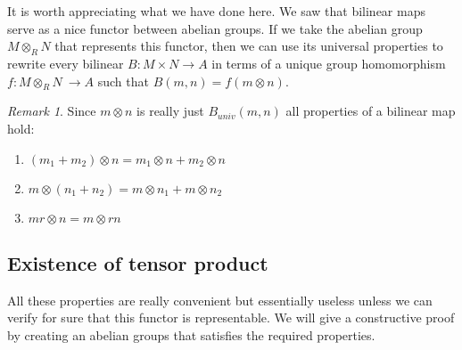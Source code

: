 \documentclass{article}
\newcommand{\tp}[2]{#1 \otimes_R #2}
\DeclareMathOperator{\Hom}{Hom}
\theoremstyle{definition}
\theoremstyle{remark}
\newtheorem*{remark}{Remark}
\theoremstyle{plain}
\begin{document}
\begin{figure}[h]
    \centering
\end{figure}

It is worth appreciating what we have done here. We saw that bilinear maps serve as a nice functor between abelian groups. If we take the abelian group \(\tp{M}{N}\) that represents this functor, then we can use its universal properties
to rewrite every bilinear \(B: M \times N \to A\) in terms of a unique group homomorphism \(f: \tp{M}{N}\ \to A\) such that \(B(m,n) = f(m\otimes n)\).

\begin{remark}
    Since \(m\otimes n\) is really just \(B_{univ}(m,n)\) all properties of a bilinear map hold:
    \begin{enumerate}
        \item \((m_1 + m_2)\otimes n = m_1 \otimes n + m_2 \otimes n\)
        \item \(m\otimes(n_1 + n_2) = m\otimes n_1 + m \otimes n_2\)
        \item \(mr \otimes n = m \otimes rn\)
    \end{enumerate}
     
\end{remark}

\subsection{Existence of tensor product}

All these properties are really convenient but essentially useless unless we can verify for sure 
that this functor is representable. We will give a constructive proof by creating an abelian groups that
satisfies the required properties. 
\end{document}

